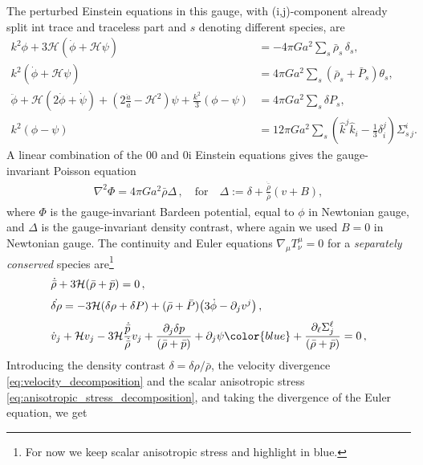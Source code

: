 The perturbed Einstein equations in this gauge, with (i,j)-component already split int trace and traceless part and $s$ denoting different species, are
\begin{align}
\label{eq:EE_00_poisson}
k^{2} \phi+3 \mathcal{H}(\dot{\phi}+\mathcal{H} \psi)&=-4 \pi G a^{2} \sum_{s} \bar{\rho}_{s} \,\delta_{s},
\\
%
k^{2}(\dot{\phi}+\mathcal{H} \psi)&=4 \pi G a^{2} \sum_{s}\left(\bar{\rho}_{s}+\bar{P}_{s}\right) \theta_{s},  \label{eq:EE_0j}
\\
%
\ddot{\phi}+\mathcal{H}(2 \dot{\phi}+\dot{\psi})+\left(2 \frac{\ddot{a}}{a}-\mathcal{H}^{2}\right) \psi+\frac{k^{2}}{3}(\phi-\psi)&=4 \pi G a^{2} \sum_{s} \delta P_{s}, \label{eq:EE_ij_diagonal}
\\
%
k^{2}(\phi-\psi)&=12 \pi G a^{2} \sum_{s}\left(\hat{k}^{j} \hat{k}_{i}-\frac{1}{3}\delta_{i}^{j}\right) \Sigma_{s\,j}^{i}. \label{eq:EE_ij_off_diagonal}
\end{align}
A linear combination of the 00 and 0i Einstein equations gives the gauge-invariant Poisson equation
\begin{align}\label{eq:poisson_gauge_invariant}
    \nabla^2\Phi= 4\pi G a^2 \bar{\rho}\Delta\, ,\quad  \text{for}\quad \Delta:=\delta +\frac{\dot{\bar{\rho}}}{\bar{\rho}}(v+B),
\end{align}
where $\Phi$ is the gauge-invariant Bardeen potential, equal to $\phi$ in Newtonian gauge, and $\Delta$ is the gauge-invariant density contrast, where again we used $B=0$ in Newtonian gauge. 
% 
The continuity and Euler equations $\nabla_\mu T^\mu_\nu=0$ for a \emph{separately conserved} species are\footnote{For now we keep {\color{blue}scalar anisotropic stress} and highlight in blue.}
{\small\begin{align}
    &\dot{\bar{\rho}} +3\mathcal{H}(\bar{\rho}+\bar{p})=0\,, \label{eq:background_continuity}\\[3pt]
    &\dot{\delta\rho}= -3\mathcal{H}(\delta\rho+\delta P) + (\bar{\rho}+\bar{P})\big(3\dot{\phi}-\partial_j v^j \big)\,,\label{eq:perturbed_continuity_drho}\\[3pt]
    &\dot{v}_j+ \mathcal{H}v_j-3\mathcal{H}\frac{\dot{\bar{p}}}{\dot{\bar{\rho}}}v_j+\frac{\partial_j\delta p}{(\bar{\rho}+\bar{p})}+\partial_j\psi{\color{blue}+\frac{\partial_\ell \Sigma^{\ell}_{j}}{(\bar{\rho}+\bar{p})}}=0\,,\label{eq:euler_vector_form}
\end{align}}
Introducing the density contrast $\delta=\delta\rho/\bar{\rho}$, the velocity divergence \eqref{eq:velocity_decomposition} and the scalar anisotropic stress \eqref{eq:anisotropic_stress_decomposition}, and taking the divergence of the Euler equation, we get
